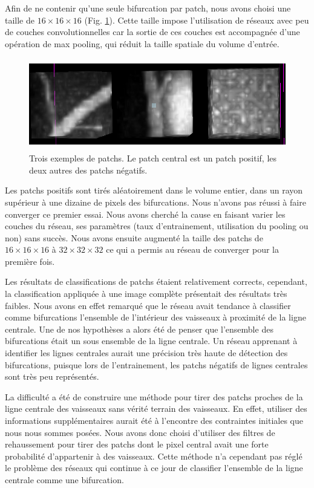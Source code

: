 Afin de ne contenir qu'une seule bifurcation par patch, nous avons choisi une taille de $16 \times 16 \times 16$ (Fig. \ref{fig:exp_patchs}). Cette taille impose l'utilisation de réseaux avec peu de couches convolutionnelles car la sortie de ces couches est accompagnée d'une opération de max pooling, qui réduit la taille spatiale du volume d'entrée. 

\begin{figure}[ht]
    \centering
    \includegraphics[height=4cm]{Images/exp_patchs_exemple.png}
    \caption{Trois exemples de patchs. Le patch central est un patch positif, les deux autres des patchs négatifs.}
    \label{fig:exp_patchs}
\end{figure}

Les patchs positifs sont tirés aléatoirement dans le volume entier, dans un rayon supérieur à une dizaine de pixels des bifurcations. Nous n'avons pas réussi à faire converger ce premier essai. Nous avons cherché la cause en faisant varier les couches du réseau, ses paramètres (taux d'entrainement, utilisation du pooling ou non) sans succès. Nous avons ensuite augmenté la taille des patchs de $16 \times 16 \times 16$ à $32 \times 32 \times 32$ ce qui a permis au réseau de converger pour la première fois.

Les résultats de classifications de patchs étaient relativement corrects, cependant, la classification appliquée à une image complète présentait des résultats très faibles. Nous avons en effet remarqué que le réseau avait tendance à classifier comme bifurcations l'ensemble de l'intérieur des vaisseaux à proximité de la ligne centrale. Une de nos hypothèses a alors été de penser que l'ensemble des bifurcations était un sous ensemble de la ligne centrale. Un réseau apprenant à identifier les lignes centrales aurait une précision très haute de détection des bifurcations, puisque lors de l'entrainement, les patchs négatifs de lignes centrales sont très peu représentés. 

La difficulté a été de construire une méthode pour tirer des patchs proches de la ligne centrale des vaisseaux sans vérité terrain des vaisseaux. En effet, utiliser des informations supplémentaires aurait été à l'encontre des contraintes initiales que nous nous sommes posées. Nous avons donc choisi d'utiliser des filtres de rehaussement pour tirer des patchs dont le pixel central avait une forte probabilité d'appartenir à des vaisseaux. Cette méthode n'a cependant pas réglé le problème des réseaux qui continue à ce jour de classifier l'ensemble de la ligne centrale comme une bifurcation.

